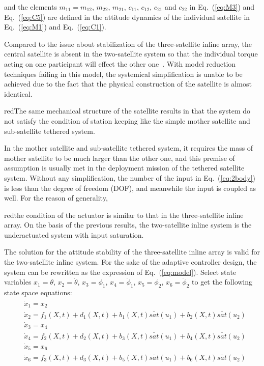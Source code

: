 and the elements $m_{11}=m_{12}$, $m_{22}$, $m_{21}$, $c_{11}$, $c_{12}$, $c_{21}$ and $c_{22}$ in Eq.~(\ref{eq:M3}) and Eq.~(\ref{eq:C5}) are defined in the attitude dynamics of the individual satellite in Eq.~(\ref{eq:M1}) and Eq.~(\ref{eq:C1}).\par
Compared to the issue about stabilization of the three-satellite inline array, the central satellite is absent in the two-satellite system so that the individual torque acting on one participant will effect the other one~\cite{chung2007nonlinear}. With model reduction techniques failing in this model, the systemical simplification is unable to be achieved due to the fact that the physical construction of the satellite is almost identical. \begin{color}{red}The same mechanical structure of the satellite results in that the system do not satisfy the condition of station keeping like the simple mother satellite and sub-satellite tethered system.\end{color} In the mother satellite and sub-satellite tethered system, it requires the mass of mother satellite to be much larger than the other one, and this premise of assumption is usually met in the deployment mission of the tethered satellite system. Without any simplification, the number of the input in Eq.~(\ref{eq:2body}) is less than the degree of freedom (DOF), and meanwhile the input is coupled as well. For the reason of generality, \begin{color}{red}the condition of the actuator is similar to that in the three-satellite inline array. On the basis of the previous results, the two-satellite inline system is the underactuated system with input saturation.\end{color}\par
The solution for the attitude stability of the three-satellite inline array is valid for the two-satellite inline system. For the sake of the adaptive controller design, the system can be rewritten as the expression of Eq.~(\ref{eq:model}). Select state variables $x_1=\theta$, $x_2=\dot\theta$, $x_3=\phi_1$, $x_4=\dot\phi_1$, $x_5=\phi_2$, $x_6=\dot\phi_2$ to get the following state space equations:
\begin{align}
\begin{split}
&\dot x_1 = x_2\\
&\dot x_2 = f_1(X,t)+d_1(X,t)+b_1(X,t)\bar{sat}(u_1)+b_2(X,t)\bar{sat}(u_2)\\
&\dot x_3 = x_4\\
&\dot x_4 = f_2(X,t)+d_2(X,t)+b_3(X,t)\bar{sat}(u_1)+b_4(X,t)\bar{sat}(u_2)\\
&\dot x_5 = x_6\\
&\dot x_6 = f_3(X,t)+d_3(X,t)+b_5(X,t)\bar{sat}(u_1)+b_6(X,t)\bar{sat}(u_2)
\end{split}\label{eq:2model}
\end{align}
